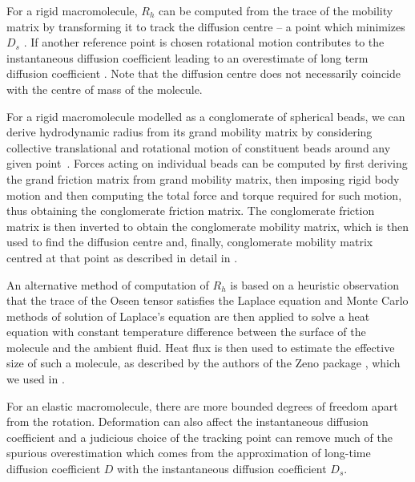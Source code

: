 \documentclass{doctoral}
\begin{document}
For a rigid macromolecule, $R_h$ can be computed from the trace of the mobility matrix by transforming it to track the diffusion centre -- a point which minimizes $D_{s}$ \cite{Zuk_2018}.
If another reference point is chosen rotational motion contributes to the instantaneous diffusion coefficient leading to an overestimate of long term diffusion coefficient \cite{Cichocki_2015}.
Note that the diffusion centre does not necessarily coincide with the centre of mass of the molecule.

For a rigid macromolecule modelled as a conglomerate of spherical beads, we can derive hydrodynamic radius from its grand mobility matrix by considering collective translational and rotational motion of constituent beads around any given point~\cite{Ekiel-Jezewska_2009}. 
Forces acting on individual beads can be computed by first deriving the grand friction matrix from grand mobility matrix, then imposing rigid body motion and then computing the total force and torque required for such motion, thus obtaining the conglomerate friction matrix. The conglomerate friction matrix is then inverted to obtain the conglomerate mobility matrix, which is then used to find the diffusion centre and, finally,  conglomerate mobility matrix centred at that point as described in detail in \textcite{Cichocki_2019}.

An alternative method of computation of $R_h$ is based on a heuristic observation that the trace of the Oseen tensor satisfies the Laplace equation and Monte Carlo methods of solution of Laplace's equation are then applied to solve a heat equation with constant temperature difference between the surface of the molecule and the ambient fluid.
Heat flux is then used to estimate the effective size of such a molecule, as described by the authors of the Zeno package \cite{Juba_2017}, which we used in \textcite{Waszkiewicz_2023_dna}.

For an elastic macromolecule, there are more bounded degrees of freedom apart from the rotation. Deformation can also affect the instantaneous diffusion coefficient and a judicious choice of the tracking point can remove much of the spurious overestimation which comes from the approximation of long-time diffusion coefficient $D$ with the instantaneous diffusion coefficient $D_{s}$. 
\end{document}
